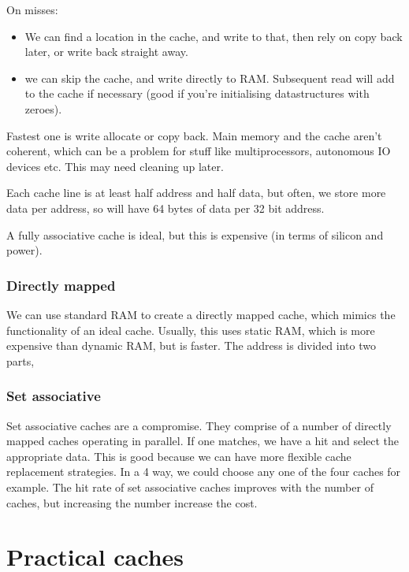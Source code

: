 On misses:

\begin{itemize}
	\item We can find a location in the cache, and write to that, then rely on
	copy back later, or write back straight away.
	\item we can skip the cache, and write directly to RAM. Subsequent read will
	add to the cache if necessary (good if you're initialising datastructures
	with zeroes).
\end{itemize}

Fastest one is write allocate or copy back. Main memory and the cache aren't
coherent, which can be a problem for stuff like multiprocessors, autonomous IO
devices etc. This may need cleaning up later.

Each cache line is at least half address and half data, but often, we store more
data per address, so will have 64 bytes of data per 32 bit address.

A fully associative cache is ideal, but this is expensive (in terms of silicon
and power).

\subsubsection{Directly mapped}

We can use standard RAM to create a directly mapped cache, which mimics the
functionality of an ideal cache. Usually, this uses static RAM, which is more
expensive than dynamic RAM, but is faster. The address is divided into two
parts, %

\subsubsection{Set associative}

Set associative caches are a compromise. They comprise of a number of directly
mapped caches operating in parallel. If one matches, we have a hit and select
the appropriate data. This is good because we can have more flexible cache
replacement strategies. In a 4 way, we could choose any one of the four caches
for example. The hit rate of set associative caches improves with the number of
caches, but increasing the number increase the cost.


\section{Practical caches}


